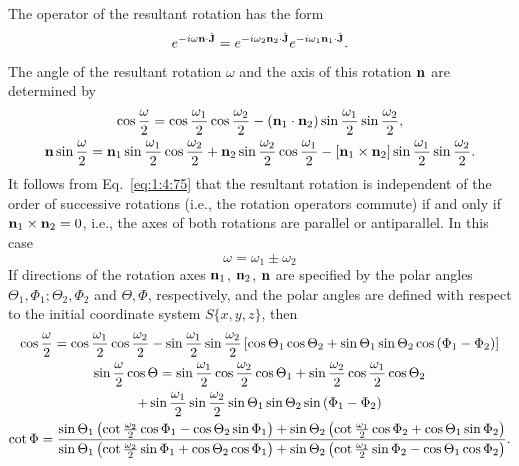 The operator of the resultant rotation has the form
\begin{equation}
e^{-i \omega \mathbf{n} \cdot \hat{\mathbf{J}}}=e^{-i \omega_{2} \mathbf{n}_{2} \cdot \hat{\mathbf{J}}} e^{-i \omega_{1} \mathbf{n}_{1} \cdot \hat{\mathbf{J}}} . \label{eq:1:4:74}
\end{equation}
The angle of the resultant rotation \(\omega\) and the axis of this rotation \(\mathbf{n}\) are determined by
\begin{gather}
\cos \frac{\omega}{2}=\cos \frac{\omega_{1}}{2} \cos \frac{\omega_{2}}{2}-\left(\mathbf{n}_{1} \cdot \mathbf{n}_{2}\right) \sin \frac{\omega_{1}}{2} \sin \frac{\omega_{2}}{2},  \label{eq:1:4:75}\\
\mathbf{n} \sin \frac{\omega}{2}=\mathbf{n}_{1} \sin \frac{\omega_{1}}{2} \cos \frac{\omega_{2}}{2}+\mathbf{n}_{2} \sin \frac{\omega_{2}}{2} \cos \frac{\omega_{1}}{2}-\left[\mathbf{n}_{1} \times \mathbf{n}_{2}\right] \sin \frac{\omega_{1}}{2} \sin \frac{\omega_{2}}{2} .\notag
\end{gather}
It follows from Eq.~\eqref{eq:1:4:75} that the resultant rotation is independent of the order of successive rotations (i.e., the rotation operators commute) if and only if \(\mathbf{n}_{1} \times \mathbf{n}_{2}=0\), i.e., the axes of both rotations are parallel or antiparallel. In this case
\[
\omega=\omega_{1} \pm \omega_{2}
\]
If directions of the rotation axes \(\mathbf{n}_{1}\), \(\mathbf{n}_{2}\), \(\mathbf{n}\) are specified by the polar angles \(\Theta_{1}, \Phi_{1} ; \Theta_{2}, \Phi_{2}\) and \(\Theta, \Phi\), respectively, and the polar angles are defined with respect to the initial coordinate system \(S\{x, y, z\}\), then
\begin{gather}
\cos \frac{\omega}{2}=\cos \frac{\omega_{1}}{2} \cos \frac{\omega_{2}}{2}-\sin \frac{\omega_{1}}{2} \sin \frac{\omega_{2}}{2}\left[\cos \Theta_{1} \cos \Theta_{2}+\sin \Theta_{1} \sin \Theta_{2} \cos \left(\Phi_{1}-\Phi_{2}\right)\right]  \notag\\
\sin \frac{\omega}{2} \cos \Theta=\sin \frac{\omega_{1}}{2} \cos \frac{\omega_{2}}{2} \cos \Theta_{1}+\sin \frac{\omega_{2}}{2} \cos \frac{\omega_{1}}{2} \cos \Theta_{2}  \notag\\
+\sin \frac{\omega_{1}}{2} \sin \frac{\omega_{2}}{2} \sin \Theta_{1} \sin \Theta_{2} \sin \left(\Phi_{1}-\Phi_{2}\right)  \label{eq:1:4:76}\\
\cot \Phi=\frac{\sin \Theta_{1}\left(\cot \frac{\omega_{2}}{2} \cos \Phi_{1}-\cos \Theta_{2} \sin \Phi_{1}\right)+\sin \Theta_{2}\left(\cot \frac{\omega_{1}}{2} \cos \Phi_{2}+\cos \Theta_{1} \sin \Phi_{2}\right)}{\sin \Theta_{1}\left(\cot \frac{\omega_{2}}{2} \sin \Phi_{1}+\cos \Theta_{2} \cos \Phi_{1}\right)+\sin \Theta_{2}\left(\cot \frac{\omega_{1}}{2} \sin \Phi_{2}-\cos \Theta_{1} \cos \Phi_{2}\right)} . \notag
\end{gather}
